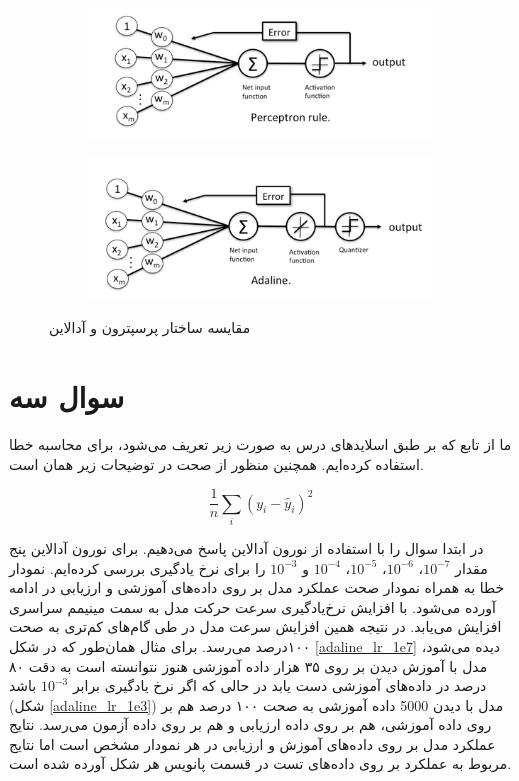 \documentclass[12pt, a4paper]{article}
\begin{document}
\begin{figure}[h]
    \begin{subfigure}{\linewidth}
        \centering
        \includegraphics[width=0.6\linewidth]{images/perceptron.png}
    \end{subfigure}
    \newline
    \begin{subfigure}{\linewidth}
        \centering
        \includegraphics[width=0.6\linewidth]{images/adaline.png}
    \end{subfigure}
    \caption{مقایسه ساختار پرسپترون و آدالاین}
    \label{perceptron_vs_adaline}
\end{figure}

\clearpage

\section*{سوال سه}

ما از تابع  که بر طبق اسلاید‌های درس به صورت زیر تعریف می‌شود، برای محاسبه خطا استفاده کرده‌ایم.
همچنین منظور از صحت در توضیحات زیر همان  است.

$$\frac{1}{n}\sum_{i}(y_i - \hat{y}_i)^2$$

در ابتدا سوال را با استفاده از نورون آدالاین پاسخ می‌دهیم. برای نورون آدالاین پنج مقدار
$10^{-7}$، $10^{-6}$، $10^{-5}$، $10^{-4}$ و $10^{-3} $ را برای نرخ یادگیری بررسی کرده‌ایم.
نمودار خطا به همراه نمودار صحت عملکرد مدل بر روی داده‌های آموزشی و ارزیابی در ادامه آورده می‌شود.
با افزایش نرخ‌یادگیری سرعت حرکت مدل به سمت مینیمم سراسری افزایش می‌یابد. در نتیجه همین افزایش سرعت
مدل در طی گام‌های کم‌تری به صحت ۱۰۰درصد می‌رسد. برای مثال همان‌طور که در شکل \ref{adaline_lr_1e7}
دیده می‌شود، مدل با آموزش دیدن بر روی ۳۵ هزار داده آموزشی هنوز نتوانسته است به دقت ۸۰ درصد در
داده‌های آموزشی دست یابد در حالی که اگر نرخ یادگیری برابر $10^{-3}$ باشد (شکل \ref{adaline_lr_1e3})
مدل با دیدن 5000 داده آموزشی به صحت ۱۰۰ درصد هم بر روی داده آموزشی، هم بر روی داده ارزیابی و هم
بر روی داده آزمون می‌رسد. نتایج عملکرد مدل بر روی داده‌های آموزش و ارزیابی در هر نمودار مشخص است
اما نتایج مربوط به عملکرد بر روی داده‌های تست در قسمت پانویس هر شکل آورده شده است.
\end{document}
